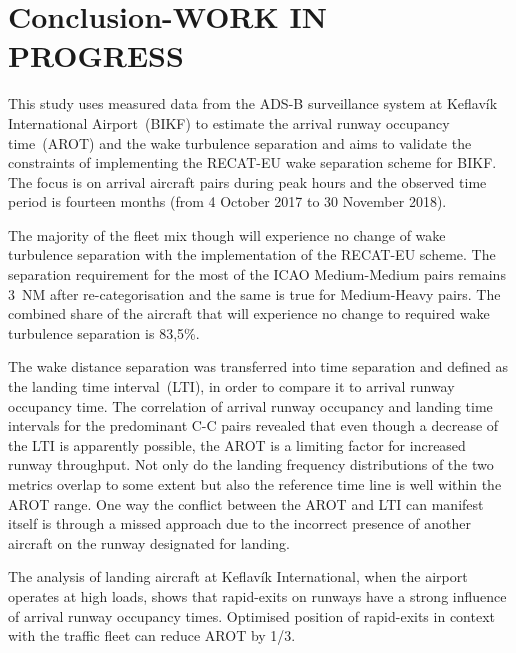 \chapter{Conclusion-WORK IN PROGRESS\label{cha:conclusions}}

This study uses measured data from the ADS-B surveillance system at Keflavík International Airport~(BIKF) to estimate the arrival runway occupancy time~(AROT) and the wake turbulence separation and aims to validate the constraints of implementing the RECAT-EU wake  separation scheme for BIKF. The focus is on arrival aircraft pairs during peak hours and the observed time period is fourteen months (from 4 October 2017 to 30 November 2018). 

The majority of the fleet mix though will experience no change of wake turbulence separation with the implementation of the RECAT-EU scheme. The separation requirement for the most of the ICAO Medium-Medium pairs remains 3~NM after re-categorisation and the same is true for Medium-Heavy pairs. The combined share of the aircraft that will experience no change to required wake turbulence separation is 83,5\%. 

The wake distance separation was transferred into time separation and defined as the landing time interval~(LTI), in order to compare it to arrival runway occupancy time.
The correlation of arrival runway occupancy and landing time intervals for the predominant C-C pairs revealed that even though a decrease of the LTI is apparently possible, the AROT is a limiting factor for increased runway throughput. Not only do the landing frequency distributions of the two metrics overlap to some extent but also the reference time line is well within the AROT range. One way the conflict between the AROT and LTI can manifest itself is through a missed approach due to the incorrect presence of another aircraft on the runway designated for landing.

The analysis of landing aircraft at Keflavík International, when the airport operates at high loads, shows that rapid-exits on runways have a strong influence of arrival runway occupancy times. Optimised position of rapid-exits in context with the traffic fleet can reduce AROT by 1/3.%

